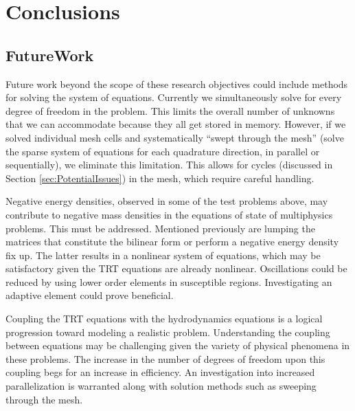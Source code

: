 \documentclass[12pt]{article}
\begin{document}
\section{Conclusions}
\label{sec:Conclusions}

\subsection{FutureWork}
\label{subsec:FutureWork}

Future work beyond the scope of these research objectives could include methods for solving the system of equations. Currently we simultaneously solve for every degree of freedom in the problem. This limits the overall number of unknowns that we can accommodate because they all get stored in memory. However, if we solved individual mesh cells and systematically ``swept through the mesh'' (solve the sparse system of equations for each quadrature direction, in parallel or sequentially), we eliminate this limitation. This allows for cycles (discussed in Section \ref{sec:PotentialIssues}) in the mesh, which require careful handling.

Negative energy densities, observed in some of the test problems above, may contribute to negative mass densities in the equations of state of multiphysics problems. This must be addressed. Mentioned previously are lumping the matrices that constitute the bilinear form or perform a negative energy density fix up. The latter results in a nonlinear system of equations, which may be satisfactory given the TRT equations are already nonlinear. Oscillations could be reduced by using lower order elements in susceptible regions. Investigating an adaptive element could prove beneficial.

Coupling the TRT equations with the hydrodynamics equations is a logical progression toward modeling a realistic problem. Understanding the coupling between equations may be challenging given the variety of physical phenomena in these problems. The increase in the number of degrees of freedom upon this coupling begs for an increase in efficiency. An investigation into increased parallelization is warranted along with solution methods such as sweeping through the mesh.

%
%
\end{document}
